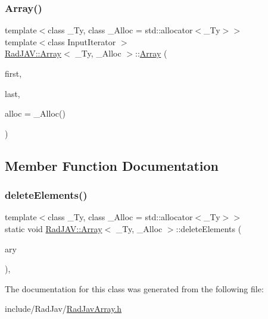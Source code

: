 \subsubsection{\texorpdfstring{Array()}{Array()}\hspace{0.1cm}{\footnotesize\ttfamily [9/9]}}
{\footnotesize\ttfamily template$<$class \+\_\+\+Ty, class \+\_\+\+Alloc = std\+::allocator$<$\+\_\+\+Ty$>$$>$ \\
template$<$class Input\+Iterator $>$ \\
\mbox{\hyperlink{class_rad_j_a_v_1_1_array}{Rad\+J\+A\+V\+::\+Array}}$<$ \+\_\+\+Ty, \+\_\+\+Alloc $>$\+::\mbox{\hyperlink{class_rad_j_a_v_1_1_array}{Array}} (\begin{DoxyParamCaption}\item[{Input\+Iterator}]{first,  }\item[{Input\+Iterator}]{last,  }\item[{const \+\_\+\+Alloc \&}]{alloc = {\ttfamily \+\_\+Alloc()} }\end{DoxyParamCaption})\hspace{0.3cm}{\ttfamily [inline]}}



\subsection{Member Function Documentation}
\mbox{\label{class_rad_j_a_v_1_1_array_a7b063e96bb17fc2433fc4fe069d9a3e4}} 
\subsubsection{\texorpdfstring{delete\+Elements()}{deleteElements()}}
{\footnotesize\ttfamily template$<$class \+\_\+\+Ty, class \+\_\+\+Alloc = std\+::allocator$<$\+\_\+\+Ty$>$$>$ \\
static void \mbox{\hyperlink{class_rad_j_a_v_1_1_array}{Rad\+J\+A\+V\+::\+Array}}$<$ \+\_\+\+Ty, \+\_\+\+Alloc $>$\+::delete\+Elements (\begin{DoxyParamCaption}\item[{\mbox{\hyperlink{class_rad_j_a_v_1_1_array}{Array}}$<$ \+\_\+\+Ty $>$ $\ast$}]{ary }\end{DoxyParamCaption})\hspace{0.3cm}{\ttfamily [inline]}, {\ttfamily [static]}}



The documentation for this class was generated from the following file\+:\begin{DoxyCompactItemize}
\item 
include/\+Rad\+Jav/\mbox{\hyperlink{_rad_jav_array_8h}{Rad\+Jav\+Array.\+h}}\end{DoxyCompactItemize}
